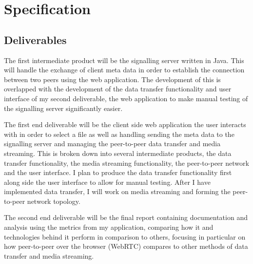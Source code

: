 \documentclass[]{report}
\begin{document}
\chapter{Specification}
	\section{Deliverables}
	The first intermediate product will be the signalling server written in Java. This will handle the exchange of client meta data in order to establish the connection between two peers using the web application. The development of this is overlapped with the development of the data transfer functionality and user interface of my second deliverable, the web application to make manual testing of the signalling server significantly easier.
	
	The first end deliverable will be the client side web application the user interacts with in order to select a file as well as handling sending the meta data to the signalling server and managing the peer-to-peer data transfer and media streaming. This is broken down into several intermediate products, the data transfer functionality, the media streaming functionality, the peer-to-peer network and the user interface. I plan to produce the data transfer functionality first along side the user interface to allow for manual testing. After I have implemented data transfer, I will work on media streaming and forming the peer-to-peer network topology. 
	
	The second end deliverable will be the final report containing documentation and analysis using the metrics from my application, comparing how it and technologies behind it perform in comparison to others, focusing in particular on how peer-to-peer over the browser (WebRTC) compares to other methods of data transfer and media streaming.
	
\end{document}
